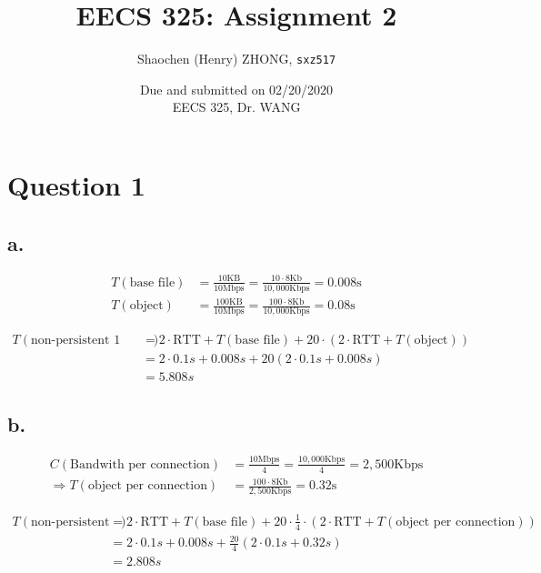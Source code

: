 \documentclass[12pt]{article}
\newcommand{\inlinecode}{\texttt}
\begin{document}
\title{\textbf{EECS 325: Assignment 2}}

\author{Shaochen (Henry) ZHONG, \inlinecode{sxz517} }
\date{Due and submitted on 02/20/2020 \\ EECS 325, Dr. WANG}
\maketitle

\section{Question 1}

\subsection{a.}

\begin{align*}
    T(\text{base file}) &= \frac{10 \text{KB}}{10 \text{Mbps}} = \frac{10 \cdot 8 \text{Kb}}{10,000 \text{Kbps}} = 0.008 \text{s} \\
    T(\text{object}) &= \frac{100 \text{KB}}{10 \text{Mbps}} = \frac{100 \cdot 8 \text{Kb}}{10,000 \text{Kbps}} = 0.08 \text{s}
\end{align*}


\begin{align*}
    T(\text{non-persistent 1 TCP}) &= 2 \cdot \text{RTT} + T(\text{base file}) + 20 \cdot (2 \cdot \text{RTT} + T(\text{object})) \\
    &= 2 \cdot 0.1s + 0.008s + 20 (2 \cdot 0.1s + 0.008s) \\
    &= 5.808s
\end{align*}


\subsection{b.}


\begin{align*}
    C(\text{Bandwith per connection}) &= \frac{10 \text{Mbps}}{4} = \frac{10,000 \text{Kbps}}{4} = 2,500 \text{Kbps} \\
    \Longrightarrow T(\text{object per connection}) &= \frac{100 \cdot 8 \text{Kb}}{2,500 \text{Kbps}} = 0.32 \text{s}
\end{align*}

\begin{align*}
    T(\text{non-persistent 4 TCP}) &= 2 \cdot \text{RTT} + T(\text{base file}) + 20 \cdot \frac{1}{4} \cdot (2 \cdot \text{RTT} + T(\text{object per connection})) \\
    &= 2 \cdot 0.1s + 0.008s + \frac{20}{4} (2 \cdot 0.1s + 0.32s) \\
    &= 2.808s
\end{align*}
\end{document}
